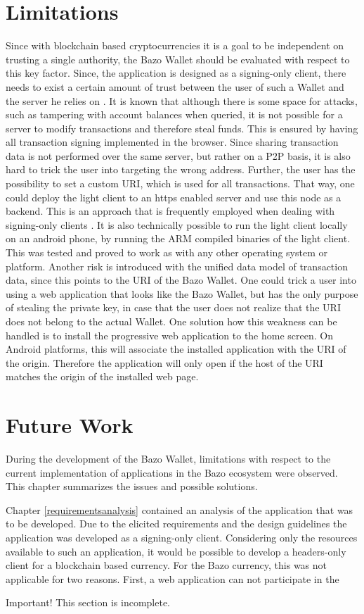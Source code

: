 \section{Limitations}\label{limitations}
Since with blockchain based cryptocurrencies it is a goal to be independent on trusting a single authority, the Bazo Wallet should be evaluated with respect to this key factor.
Since, the application is designed as a signing-only client, there needs to exist a certain amount of trust between the user of such a Wallet and the server he relies on \cite{bitcoinclients}.
It is known that although there is some space for attacks, such as tampering with account balances when queried, it is not possible for a server to modify transactions and therefore steal funds. This is ensured by having all transaction signing implemented in the browser. Since sharing transaction data is not performed over the same server, but rather on a P2P basis, it is also hard to trick the user into targeting the wrong address. Further, the user has the possibility to set a custom URI, which is used for all transactions. That way, one could deploy the light client to an https enabled server and use this node as a backend. This is an approach that is frequently employed when dealing with signing-only clients \cite{bitcoinclients}. It is also technically possible to run the light client locally on an android phone, by running the ARM compiled binaries of the light client. This was tested and proved to work as with any other operating system or platform.
Another risk is introduced with the unified data model of transaction data, since this points to the URI of the Bazo Wallet. One could trick a user into using a web application that looks like the Bazo Wallet, but has the only purpose of stealing the private key, in case that the user does not realize that the URI does not belong to the actual Wallet.
One solution how this weakness can be handled is to install the progressive web application to the home screen. On Android platforms, this will associate the installed application with the URI of the origin. Therefore the application will only open if the host of the URI matches the origin of the installed web page.
\section{Future Work}
During the development of the Bazo Wallet, limitations with respect to the current implementation of applications in the Bazo ecosystem were observed. This chapter summarizes the issues and possible solutions.

Chapter \ref{requirementsanalysis} contained an analysis of the application that was to be developed. Due to the elicited requirements and the design guidelines the application was developed as a signing-only client. Considering only the resources available to such an application, it would be possible to develop a headers-only client for a blockchain based currency. For the Bazo currency, this was not applicable for two reasons. First, a web application can not participate in the 
\begin{bclogo}[logo=\bcattention, couleurBarre=red, noborder=true, 
               couleur=LightSalmon]{Important!}
This section is incomplete.
\end{bclogo}